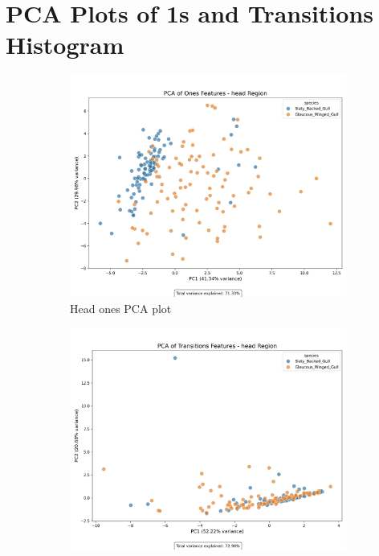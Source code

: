 \documentclass[a4paper,12pt]{report}
\begin{document}
\section{PCA Plots of 1s and Transitions Histogram}
\begin{figure}[H]
    \centering
    \begin{subfigure}[b]{0.48\textwidth}
        \includegraphics[width=\textwidth]{images/appendix/Original/pca/head_ones_pca_plot.png}
        \caption{Head ones PCA plot}
    \end{subfigure}
    \hfill
    \begin{subfigure}[b]{0.48\textwidth}
        \includegraphics[width=\textwidth]{images/appendix/Original/pca/head_transitions_pca_plot.png}

\end{subfigure}
\end{figure}
\end{document}
